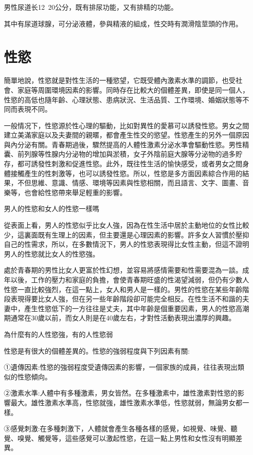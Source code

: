 \documentclass[12pt,UTF8]{ctexbook}
\begin{document}
男性尿道长12~20公分，既有排尿功能，又有排精的功能。

其中有尿道球腺，可分泌液體，參與精液的組成，性交時有潤滑陰莖頭的作用。

\chapter{性慾}

簡單地說，性慾就是對性生活的一種慾望，它既受體內激素水準的調節，也受社會、家庭等周圍環境因素的影響。同時存在比較大的個體差異，即使是同一個人，性慾的高低也隨年齡、心理狀態、患病狀況、生活品質、工作環境、婚姻狀態等不同而表現不同。

一般情况下，性慾源於性心理的驅動，比如對異性的愛慕可以誘發性慾。男女之間建立美滿家庭以及夫妻間的親暱，都會產生性交的慾望。性慾產生的另外一個原因與內分泌有關。青春期過後，驟然提高的人體性激素分泌水準會驅動性慾。男性精囊、前列腺等性腺内分泌物的增加與淤積，女子外陰前庭大腺等分泌物的過多貯存，都可誘發性刺激和促進性慾。此外，既往性生活的愉快感受，或者男女之間身體接觸產生的性刺激等，也可以誘發性慾。所以，性慾是多方面因素綜合作用的結果，不但思維、意識、情感、環境等因素與性慾相關，而且語言、文字、圖畫、音樂等，也會給性慾帶來舉足輕重的影響。

男人的性慾和女人的性慾一樣嗎

從表面上看，男人的性慾似乎比女人強，因為在性生活中居於主動地位的女性比較少，這裏面既有生理上的因素，但主要還是心理因素的影響。許多女人習慣於壓抑自己的性需求，所以，在多數情況下，男人的性慾表現得比女性主動，但這不證明男人的性慾就比女人的性慾強。

處於青春期的男性比女人更富於性幻想，並容易將感情需要和性需要混為一談。成年以後，工作的壓力和家庭的負擔，會使青春期旺盛的性渴望減弱，但仍有少數人性慾一直比較強烈，在這一點上，女人和男人是一樣的。男性的性慾在某些年齡階段表現得要比女人強，但在另一些年齡階段卻可能完全相反。在性生活不和諧的夫妻中，產生性慾低下的一方往往是丈夫，其中年齡是個重要因素，男人的性慾高潮期通常在30歲以前，而女人則是在40歲左右，才對性活動表現出濃厚的興趣。

為什麼有的人性慾強，有的人性慾弱

性慾是有很大的個體差異的。性慾的強弱程度與下列因素有關:

①遺傳因素:性慾的強弱程度受遺傳因素的影響，一個家族的成員，往往表現出類似的性慾傾向。

②激素水準:人體中有多種激素，男女皆然。在多種激素中，雄性激素對性慾的影響最大。雄性激素水準高，性慾就強，雄性激素水準低，性慾就弱，無論男女都一樣。

③感覺刺激:在多種刺激下，人體就會產生各種各樣的感覺，如視覺、味覺、聽覺、嗅覺、觸覺等，這些感覺可以激起性慾，在這一點上男性和女性沒有明顯差異。
\end{document}

